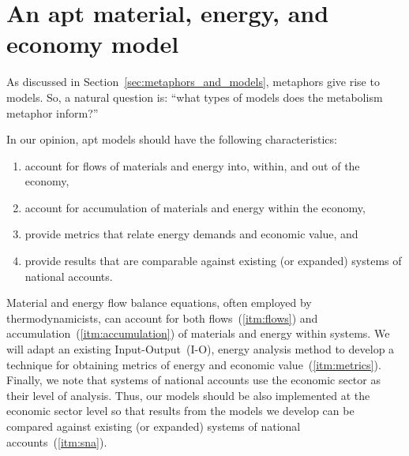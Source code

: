 \section{An apt material, energy, and economy model}
\label{sec:apt_models}

As discussed in Section~\ref{sec:metaphors_and_models}, 
metaphors give rise to models.
So, a natural question is: 
``what types of models does the metabolism metaphor inform?''

In our opinion, apt models should have the following characteristics:

\begin{enumerate}
	\item{\label{itm:flows}account for flows of materials and energy 
			into, within, and out of the economy,}
	\item{\label{itm:accumulation}account for accumulation of materials and energy 
			within the economy,}
	\item{\label{itm:metrics}provide metrics that relate energy demands and economic value, and}
	\item{\label{itm:sna}provide results that are comparable against existing 
			(or expanded) systems of national accounts.}
\end{enumerate}

Material and energy flow balance equations, 
often employed by thermodynamicists, 
can account for both flows~(\ref{itm:flows}) and accumulation~(\ref{itm:accumulation}) 
of materials and energy within systems.
We will adapt an existing Input-Output~(I-O),
energy analysis method to develop a 
technique for obtaining metrics of energy and economic value~(\ref{itm:metrics}).
Finally, we note that systems of national accounts use the economic sector
as their level of analysis. 
Thus, our models should be also implemented at the economic sector level
so that results from the models we develop can be 
compared against existing (or expanded) systems of national accounts~(\ref{itm:sna}).


